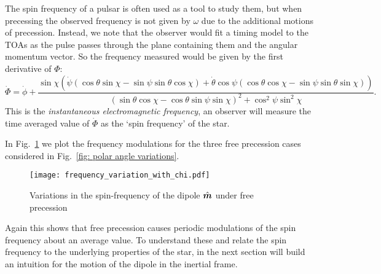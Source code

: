 \documentclass[../full_thesis/full_thesis.tex]{subfiles}
\begin{document}
The spin frequency of a pulsar is often used as a tool to study them, but when
precessing the observed frequency is not given by $\omega$ due to the
additional motions of precession. Instead, we note that the observer would
fit a timing model to the TOAs as the pulse passes through the plane containing
them and the angular momentum vector. So the frequency measured would be given
by the first derivative of $\Phi$:
\begin{equation}
\dot{\Phi} = \dot{\phi}
+ \frac{\sin\chi \left(
\dot{\psi} (\cos\theta\sin\chi - \sin \psi \sin \theta \cos\chi) +
\dot{\theta} \cos\psi (\cos\theta\cos\chi - \sin \psi \sin \theta \sin\chi)\right)
}{(\sin\theta \cos \chi - \cos \theta \sin \psi \sin \chi)^{2} + \cos^{2}\psi \sin^{2} \chi}.
\label{eqn: Phi_dot}
\end{equation}
This is the \emph{instantaneous electromagnetic frequency}, an observer
will measure the time averaged value of $\dot{\Phi}$ as the `spin frequency' of
the star.

In Fig.~\ref{fig: frequency variations} we plot the frequency modulations for the
three free precession cases considered in Fig.~\eqref{fig: polar angle variations}.
\begin{figure}[ht]
\centering
  \texttt{[image: frequency\_variation\_with\_chi.pdf]}
\caption{Variations in the spin-frequency of the dipole $\hat{\boldsymbol{m}}$ under free precession}
\label{fig: frequency variations}
\end{figure}
Again this shows that free precession causes periodic modulations of the spin
frequency about an average value. To understand these and relate the spin
frequency to the underlying properties of the star, in the next section will
build an intuition for the motion of the dipole in the inertial frame.
\end{document}
